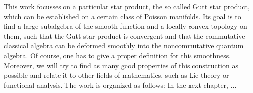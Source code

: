 This work focusses on a particular star product, the so called Gutt star product, which can be established on a certain class of Poisson manifolds. Its goal is to find a large subalgebra of the smooth function and a locally convex topology on them, such that the Gutt star product is convergent and that the commutative classical algebra can be deformed smoothly into the noncommutative quantum algebra. Of course, one has to give a proper definition for this smoothness. Moreover, we will try to find as many good properties of this construction as possible and relate it to other fields of mathematics, such as Lie theory or functional analysis.
The work is organized as follows: In the next chapter, ...
